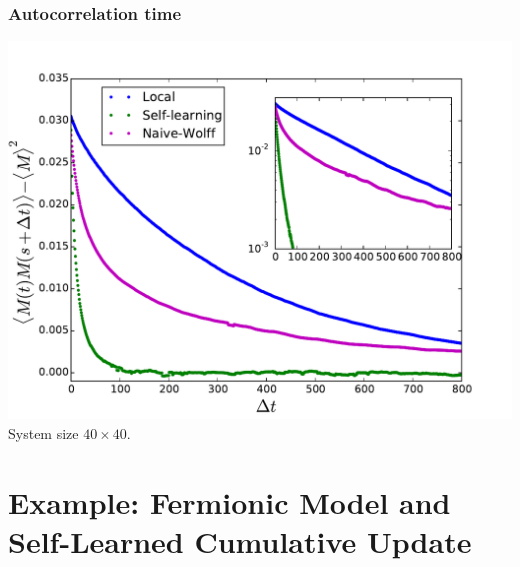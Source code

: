 \documentclass[xcolor=table, 10pt, aspectratio=169]{beamer}
\begin{document}

\begin{frame}
  \frametitle{Autocorrelation time}
  \centering
  \includegraphics[width=.6\textwidth]{auto_decay}\\
  System size $40\times40$.
\end{frame}

\section{Example: Fermionic Model and Self-Learned Cumulative Update}
\end{document}

